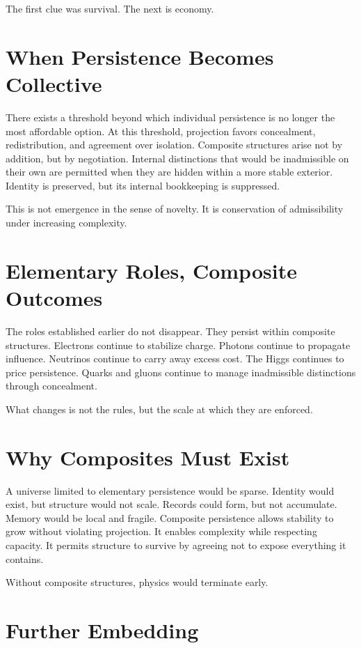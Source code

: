 \documentclass[11pt,twoside,openright]{book}
\begin{document}
The first clue was survival. The next is economy.

\section*{When Persistence Becomes Collective}

There exists a threshold beyond which individual persistence is no longer the most affordable option. At this threshold, projection favors concealment, redistribution, and agreement over isolation. Composite structures arise not by addition, but by negotiation. Internal distinctions that would be inadmissible on their own are permitted when they are hidden within a more stable exterior. Identity is preserved, but its internal bookkeeping is suppressed.

This is not emergence in the sense of novelty. It is conservation of admissibility under increasing complexity.

\section*{Elementary Roles, Composite Outcomes}

The roles established earlier do not disappear. They persist within composite structures. Electrons continue to stabilize charge. Photons continue to propagate influence. Neutrinos continue to carry away excess cost. The Higgs continues to price persistence. Quarks and gluons continue to manage inadmissible distinctions through concealment.

What changes is not the rules, but the scale at which they are enforced.

\section*{Why Composites Must Exist}

A universe limited to elementary persistence would be sparse. Identity would exist, but structure would not scale. Records could form, but not accumulate. Memory would be local and fragile. Composite persistence allows stability to grow without violating projection. It enables complexity while respecting capacity. It permits structure to survive by agreeing not to expose everything it contains.

Without composite structures, physics would terminate early.

\section*{Further Embedding}
\end{document}
